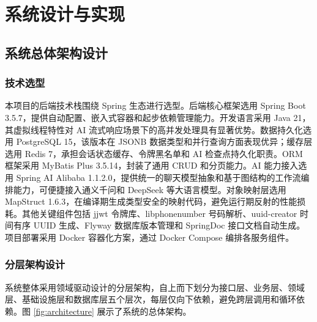 \clearpage

\section{系统设计与实现}



\subsection{系统总体架构设计}

\subsubsection{技术选型}

\par 本项目的后端技术栈围绕 Spring 生态进行选型。后端核心框架选用 Spring Boot 3.5.7，提供自动配置、嵌入式容器和起步依赖管理能力。开发语言采用 Java 21，其虚拟线程特性对 AI 流式响应场景下的高并发处理具有显著优势。数据持久化选用 PostgreSQL 15，该版本在 JSONB 数据类型和并行查询方面表现优异；缓存层选用 Redis 7，承担会话状态缓存、令牌黑名单和 AI 检查点持久化职责。ORM 框架采用 MyBatis Plus 3.5.14，封装了通用 CRUD 和分页能力。AI 能力接入选用 Spring AI Alibaba 1.1.2.0，提供统一的聊天模型抽象和基于图结构的工作流编排能力，可便捷接入通义千问和 DeepSeek 等大语言模型。对象映射层选用 MapStruct 1.6.3，在编译期生成类型安全的映射代码，避免运行期反射的性能损耗。其他关键组件包括 jjwt 令牌库、libphonenumber 号码解析、uuid-creator 时间有序 UUID 生成、Flyway 数据库版本管理和 SpringDoc 接口文档自动生成。项目部署采用 Docker 容器化方案，通过 Docker Compose 编排各服务组件。

\subsubsection{分层架构设计}

\par 系统整体采用领域驱动设计的分层架构，自上而下划分为接口层、业务层、领域层、基础设施层和数据库层五个层次，每层仅向下依赖，避免跨层调用和循环依赖。图 \ref{fig:architecture} 展示了系统的总体架构。

